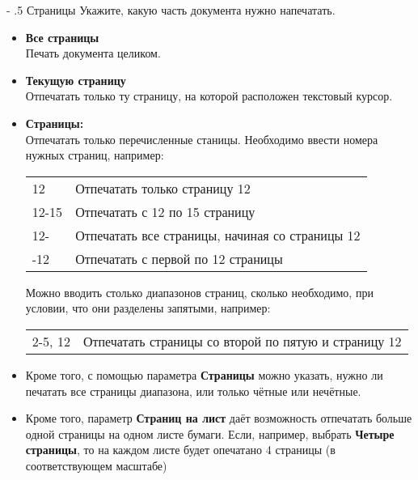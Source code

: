 ﻿\documentclass[a4paper,10pt]{article}
\makeatletter
\renewcommand\paragraph{%
   \@startsection{paragraph}{4}{0mm}%
      {-\baselineskip}%
      {.5\baselineskip}%
      {\normalfont\normalsize\bfseries}}
\makeatother
\begin{document}
\paragraph{Страницы}
Укажите, какую часть документа нужно напечатать.
\begin{itemize}
 \item \textbf{Все страницы}\\
 Печать документа целиком.
 \item \textbf{Текущую страницу}\\
 Отпечатать только ту страницу, на которой расположен текстовый курсор.
 \item \textbf{Страницы:}\\
 Отпечатать только перечисленные станицы. Необходимо ввести номера нужных страниц, например:
 
 \begin{center}
\begin{tabular}{  m{2cm}  m{12cm}  }  
12  & Отпечатать только страницу 12\\ 
12-15 & Отпечатать с 12 по 15 страницу\\ 
12- & Отпечатать все страницы, начиная со страницы 12\\ 
-12 & Отпечатать с первой по 12 страницы\\ 
\end{tabular} 
\end{center}

Можно вводить столько диапазонов страниц, сколько необходимо, при условии, что они разделены запятыми, например:

 \begin{center}
\begin{tabular}{  m{2cm}  m{12cm}  }  
2-5, 12  & Отпечатать страницы со второй по пятую и страницу 12\\ 
\end{tabular} 
\end{center}
\item Кроме того, с помощью параметра \textbf{Страницы} можно указать, нужно ли печатать все страницы диапазона, или только чётные или нечётные.
\item Кроме того, параметр \textbf{Страниц на лист} даёт возможность отпечатать больше одной страницы на одном листе бумаги. Если, например, выбрать \textbf{Четыре страницы}, то на каждом листе будет опечатано 4 страницы (в соответствующем масштабе)
\end{itemize}
\end{document}
